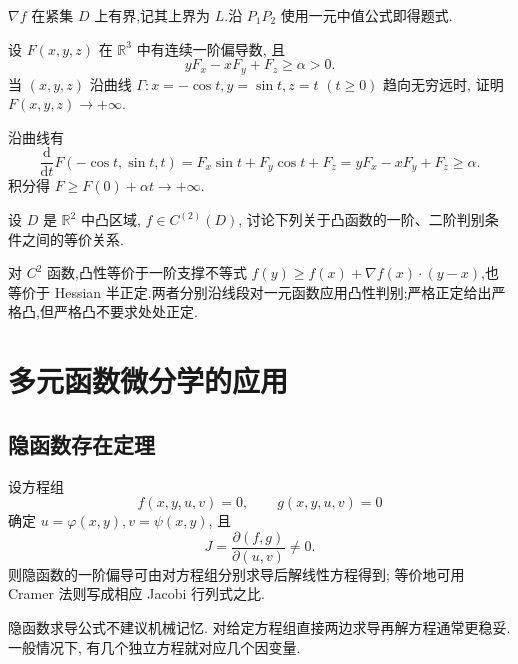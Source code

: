 \begin{solution}
    $\nabla f$ 在紧集 $D$ 上有界,记其上界为 $L$.沿 $P_1P_2$ 使用一元中值公式即得题式.
\end{solution}

\begin{example}
    设 $F(x,y,z)$ 在 $\mathbb{R}^3$ 中有连续一阶偏导数, 且
    \[
        yF_x-xF_y+F_z\geq\alpha>0.
    \]
    当 $(x,y,z)$ 沿曲线 $\Gamma:x=-\cos t,y=\sin t,z=t$ $(t\geq0)$ 趋向无穷远时, 证明 $F(x,y,z)\to+\infty$.
\end{example}
\exampleblank

\begin{solution}
    沿曲线有
    \[
        \dfrac{\mathrm d}{\mathrm dt}F(-\cos t,\sin t,t)=F_x\sin t+F_y\cos t+F_z
        =yF_x-xF_y+F_z\geq\alpha.
    \]
    积分得 $F\geq F(0)+\alpha t\to+\infty$.
\end{solution}

\begin{example}
    设 $D$ 是 $\mathbb{R}^2$ 中凸区域, $f\in C^{(2)}(D)$, 讨论下列关于凸函数的一阶、二阶判别条件之间的等价关系.
\end{example}
\exampleblank

\begin{solution}
    对 $C^2$ 函数,凸性等价于一阶支撑不等式 $f(y)\geq f(x)+\nabla f(x)\cdot(y-x)$,也等价于 Hessian 半正定.两者分别沿线段对一元函数应用凸性判别;严格正定给出严格凸,但严格凸不要求处处正定.
\end{solution}


\newpage

\section{多元函数微分学的应用}


\subsection{隐函数存在定理}

\begin{theorem}[\markstar]
    设方程组
    \[
        f(x,y,u,v)=0,\qquad g(x,y,u,v)=0
    \]
    确定 $u=\varphi(x,y),v=\psi(x,y)$, 且
    \[
        J=\dfrac{\partial(f,g)}{\partial(u,v)}\ne0.
    \]
    则隐函数的一阶偏导可由对方程组分别求导后解线性方程得到; 等价地可用 Cramer 法则写成相应 Jacobi 行列式之比.
\end{theorem}

\begin{remark}
    隐函数求导公式不建议机械记忆. 对给定方程组直接两边求导再解方程通常更稳妥. 一般情况下, 有几个独立方程就对应几个因变量.
\end{remark}



